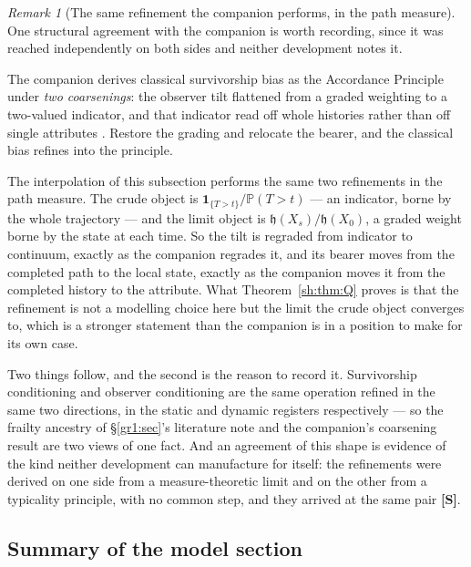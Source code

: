 \documentclass[11pt]{article}
\numberwithin{equation}{section}
\theoremstyle{plain}
\theoremstyle{definition}
\theoremstyle{remark}
\newtheorem{remark}[theorem]{Remark}
\newcommand{\PP}{\mathbb{P}}
\newcommand{\one}{\mathbf{1}}
\newcommand{\hm}{\mathfrak{h}}
\begin{document}
\begin{remark}[The same refinement the companion performs, in the path
measure]\label{sh:rem:coarsenings}
One structural agreement with the companion is worth recording, since
it was reached independently on both sides and neither development
notes it.

The companion derives classical survivorship bias as the Accordance
Principle under \emph{two coarsenings}: the observer tilt flattened
from a graded weighting to a two-valued indicator, and that indicator
read off whole histories rather than off single attributes
\cite{Nexus, NexicFoundation}. Restore the grading and relocate the
bearer, and the classical bias refines into the principle.

The interpolation of this subsection performs the same two refinements
in the path measure. The crude object is
$\one_{\{T>t\}}/\PP(T>t)$ --- an indicator, borne by the whole
trajectory --- and the limit object is $\hm(X_s)/\hm(X_0)$, a graded
weight borne by the state at each time. So the tilt is regraded from
indicator to continuum, exactly as the companion regrades it, and its
bearer moves from the completed path to the local state, exactly as the
companion moves it from the completed history to the attribute. What
Theorem~\ref{sh:thm:Q} proves is that the refinement is not a
modelling choice here but the limit the crude object converges to,
which is a stronger statement than the companion is in a position to
make for its own case.

Two things follow, and the second is the reason to record it.
Survivorship conditioning and observer conditioning are the same
operation refined in the same two directions, in the static and
dynamic registers respectively --- so the frailty ancestry of
\S\ref{gr1:sec}'s literature note and the companion's coarsening
result are two views of one fact. And an agreement of this shape is
evidence of the kind neither development can manufacture for itself:
the refinements were derived on one side from a measure-theoretic
limit and on the other from a typicality principle, with no common
step, and they arrived at the same pair \textbf{[S]}.
\end{remark}

\subsection*{Summary of the model section}
\end{document}
